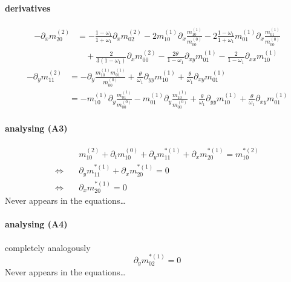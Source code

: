 \documentclass{article}
\begin{document}
  \paragraph{derivatives}
  \begin{equation}
    \tag{C5}
    \begin{aligned}
      - \partial_x m_{20}^{(2)} &=
      - \frac{1-\omega_1}{1+\omega_1} \partial_x m_{02}^{(2)}
      - 2 m_{10}^{(1)} \partial_x \frac{ m_{10}^{(1)} }{m_{00}^{(0)}}
      - 2 \frac{1-\omega_1}{1+\omega_1} m_{01}^{(1)}\partial_x\frac{m_{01}^{(1)}}{m_{00}^{(0)}}
      \\&\quad
      + \frac{ 2}{3(1-\omega_1)} \partial_x m_{00}^{(2)}
      - \frac{2\theta}{1-\omega_1}\partial_{xy} m_{01}^{(1)}
      - \frac{2}{1-\omega_1}\partial_{xx} m_{10}^{(1)}
    \end{aligned}
  \end{equation}
  \begin{equation}
    \tag{C6}
    \begin{aligned}
    -\partial_y m_{11}^{(2)} &=  -\partial_y \frac{ m_{10}^{(1)}m_{01}^{(1)}}{m_{00}^{(0)}}
    + \frac{\theta}{\omega_1}\partial_{yy} m_{10}^{(1)} + \frac{\theta}{\omega_1}\partial_{xy} m_{01}^{(1)}
    \\&=
    -m_{10}^{(1)}\partial_y \frac{ m_{01}^{(1)}}{m_{00}^{(0)}}
    -m_{01}^{(1)}\partial_y \frac{ m_{10}^{(1)}}{m_{00}^{(0)}}
    + \frac{\theta}{\omega_1}\partial_{yy} m_{10}^{(1)}
    + \frac{\theta}{\omega_1}\partial_{xy} m_{01}^{(1)}
    \end{aligned}
  \end{equation}

  \paragraph{analysing (A3)}
  \begin{align*}
    &m_{10}^{(2)} + \partial_t m_{10}^{(0)} + \partial_y m_{11}^{*(1)} + \partial_x m_{20}^{*(1)} = m_{10}^{*(2)}
    \\ \Leftrightarrow \quad &
    \partial_y m_{11}^{*(1)} + \partial_x m_{20}^{*(1)} = 0
    \\ \Leftrightarrow \quad &
    \partial_x m_{20}^{*(1)} = 0
  \end{align*}
  Never appears in the equations\ldots
  \paragraph{analysing (A4)} completely analogously
  \begin{equation*}
    \partial_y m_{02}^{*(1)} = 0
  \end{equation*}
  Never appears in the equations\ldots
\end{document}

